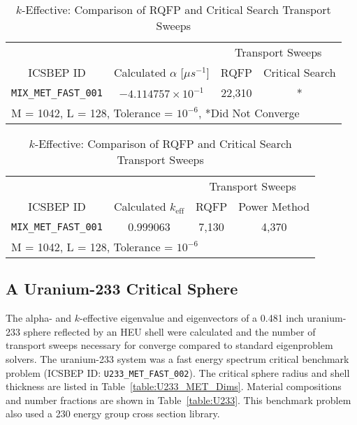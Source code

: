 \begin{table}[!htbp]
	\caption{Calculated Eigenvalues and Transport Sweep Comparisons for PU/HEU System}
	\label{table:MIX_MET_Eigs}
	\begin{subtable}[!htbp]{1.0\textwidth}
	\centering{}
	\begin{tabular}{@{}cccc@{}}\toprule
	& & \multicolumn{2}{c}{Transport Sweeps} \\
	\cmidrule{3-4} ICSBEP ID & Calculated $\alpha$ [$\mu s^{-1}$] & RQFP & Critical Search \\
	\midrule
	\texttt{MIX\_MET\_FAST\_001} & $-4.114757 \times 10^{-1}$ & 22,310 & * \\
	\bottomrule
	\multicolumn{4}{l}{M = 1042, L = 128, Tolerance = $10^{-6}$, *Did Not Converge} \\
	\end{tabular}
	\caption{Alpha-Eigenvalue: Comparison of RQFP and Critical Search Transport Sweeps}
	\label{table:MIX_MET_Alpha}
	\end{subtable}%
	\vspace{0.25cm}
	\begin{subtable}[!htbp]{1.0\textwidth}
	\centering{}
	\begin{tabular}{@{}cccc@{}}\toprule
	& & \multicolumn{2}{c}{Transport Sweeps} \\
	\cmidrule{3-4} ICSBEP ID & Calculated $k_{\text{eff}}$ & RQFP & Power Method \\
	\midrule
	\texttt{MIX\_MET\_FAST\_001} & 0.999063 & 7,130 & 4,370 \\
	\bottomrule
	\multicolumn{4}{l}{M = 1042, L = 128, Tolerance = $10^{-6}$} \\
	\end{tabular}
	\caption{$k$-Effective: Comparison of RQFP and Critical Search Transport Sweeps}
	\label{table:MIX_MET_k}
	\end{subtable}%
\end{table}

\clearpage
\subsection{A Uranium-233 Critical Sphere}

The alpha- and $k$-effective eigenvalue and eigenvectors of a 0.481 inch uranium-233 sphere reflected by an HEU shell were calculated and the number of transport sweeps necessary for converge compared to standard eigenproblem solvers. The uranium-233 system was a fast energy spectrum critical benchmark problem (ICSBEP ID: \texttt{U233\_MET\_FAST\_002}). The critical sphere radius and shell thickness are listed in Table~\ref{table:U233_MET_Dims}. Material compositions and number fractions are shown in Table~\ref{table:U233}. This benchmark problem also used a 230 energy group cross section library.

